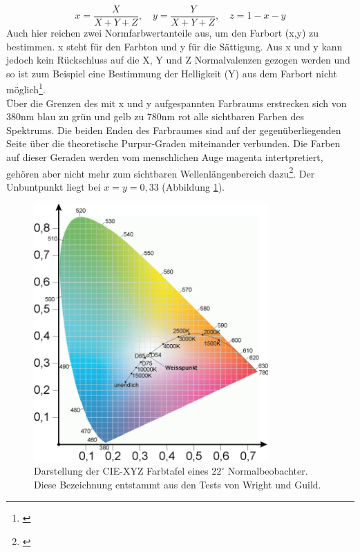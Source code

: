 \begin{equation}\label{gl_xyz2}
		x = \frac{X}{X+Y+Z},\quad y = \frac{Y}{X+Y+Z},\quad z = 1-x-y
\end{equation}
Auch hier reichen zwei Normfarbwertanteile aus, um den Farbort (x,y) zu bestimmen. x steht für den Farbton und y für die Sättigung. Aus x und y kann jedoch kein Rückschluss auf die X, Y und Z Normalvalenzen gezogen werden und so ist zum Beispiel eine Bestimmung der Helligkeit (Y) aus dem Farbort nicht möglich\footnote{\cite[79]{greule}}.\\
Über die Grenzen des mit x und y aufgespannten Farbraums erstrecken sich von 380nm blau zu grün und gelb zu 780nm rot alle sichtbaren Farben des Spektrums. Die beiden Enden des Farbraumes sind auf der gegenüberliegenden Seite über die theoretische Purpur-Graden miteinander verbunden. Die Farben auf dieser Geraden werden vom menschlichen Auge magenta intertpretiert, gehören aber nicht mehr zum sichtbaren Wellenlängenbereich dazu\footnote{\cite[73]{mueller}}. Der Unbuntpunkt liegt bei $x=y=0,33$ (Abbildung \ref{b_xyz1}).

\begin{figure}[H]     %
\centering
\includegraphics[width=0.8\textwidth]{bilder/xyz1} 
\caption {Darstellung der CIE-XYZ Farbtafel eines 2$2^\circ$ Normalbeobachter. Diese Bezeichnung entstammt aus den Tests von Wright und Guild. \protect\footnotemark}\label{b_xyz1}
\end{figure}

